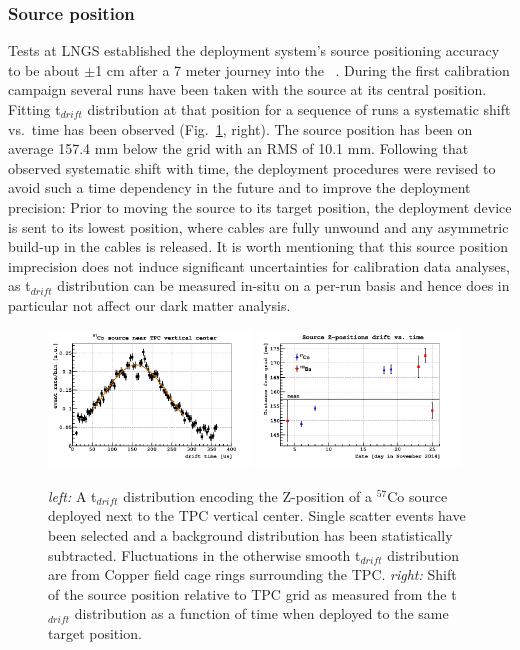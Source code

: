 \subsubsection{Source position}
Tests at LNGS established the deployment system's source positioning accuracy to be about $\pm$1 cm after a 7 meter journey into the \dsf\ \lsv.
During the first calibration campaign several runs have been taken with the source at its central position. %
Fitting t$_{drift}$ distribution at that position for a sequence of runs a systematic shift vs.~time has been observed (Fig.~\ref{fig:SourcePosition}, right). The source position has been on average 157.4 mm below the grid with an RMS of 10.1 mm. Following that observed systematic shift with time, the deployment procedures were revised to avoid such a time dependency in the future and to improve the deployment precision: Prior to moving the source to its target position, the deployment device is sent to its lowest position, where cables are fully unwound and any asymmetric build-up in the cables is released. It is worth mentioning that this source position imprecision does not induce significant uncertainties for calibration data analyses, as t$_{drift}$ distribution can be measured in-situ on a per-run basis and hence does in particular not affect our dark matter analysis.
\begin{figure}[htbp]
\centering
\includegraphics[width=0.48\textwidth]{./Figures/Tdrift_distribution_Co57.png}
\includegraphics[width=0.48\textwidth]{./Figures/SourcePosition_vs_time.png}
\caption{\textit{left:} A t$_{drift}$ distribution encoding the Z-position of a $^{57}$Co source deployed next to the TPC vertical center. Single scatter events have been selected and a background distribution has been statistically subtracted. Fluctuations in the otherwise smooth t$_{drift}$ distribution are from Copper field cage rings surrounding the TPC.
\textit{right:} Shift of the source position relative to TPC grid as measured from the t$_{drift}$ distribution as a function of time when deployed to the same target position.
\label{fig:SourcePosition}} 
\end{figure}

